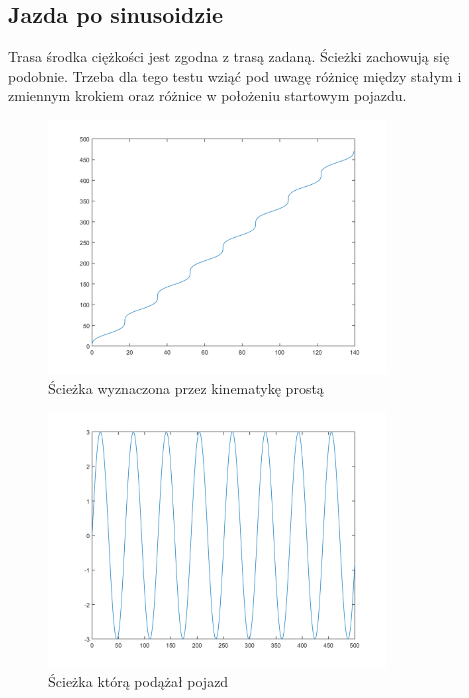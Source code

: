 \documentclass[a4paper, 12pt]{report}
\begin{document}
			\subsection{Jazda po sinusoidzie}
				Trasa środka ciężkości jest zgodna z trasą zadaną. Ścieżki zachowują się podobnie. Trzeba dla tego testu wziąć pod uwagę różnicę między stałym i zmiennym krokiem oraz różnice w położeniu startowym pojazdu.
				\begin{figure}[H]
					\centering
					\includegraphics[width = 0.8\textwidth]{./AP/img/rev/sin_in_1.png}
					\caption{Ścieżka wyznaczona przez kinematykę prostą}
				\end{figure}
				\begin{figure}[H]
					\centering
					\includegraphics[width = 0.8\textwidth]{./AP/img/rev/sin_in_2.png}
					\caption{Ścieżka którą podążał pojazd}
				\end{figure}
\end{document}

